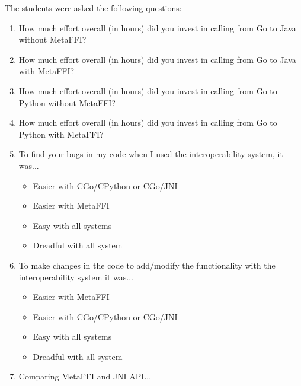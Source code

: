 \documentclass[sigplan,10pt,manuscript,nonacm]{acmart}
\begin{document}
The students were asked the following questions:
\begin{enumerate}
    \item How much effort overall (in hours) did you invest in calling from Go to Java without MetaFFI?
    \vspace{-2mm}\item How much effort overall (in hours) did you invest in calling from Go to Java with MetaFFI?
    \vspace{-2mm}\item How much effort overall (in hours) did you invest in calling from Go to Python without MetaFFI?
    \vspace{-2mm}\item How much effort overall (in hours) did you invest in calling from Go to Python with MetaFFI?
    \vspace{-2mm}\item To find your bugs in my code when I used the interoperability system, it was...
    \begin{itemize}
        \vspace{-2mm}\item Easier with CGo/CPython or CGo/JNI
        \vspace{-2mm}\item Easier with MetaFFI
        \vspace{-2mm}\item Easy with all systems
        \vspace{-2mm}\item Dreadful with all system
    \end{itemize}
    \vspace{-2mm}\item To make changes in the code to add/modify the functionality with the interoperability system it was...
    \begin{itemize}
        \vspace{-2mm}\item Easier with MetaFFI
        \vspace{-2mm}\item Easier with CGo/CPython or CGo/JNI
        \vspace{-2mm}\item Easy with all systems
        \vspace{-2mm}\item Dreadful with all system
    \end{itemize}
    \vspace{-2mm}\item Comparing MetaFFI and JNI API...

\end{enumerate}
\end{document}
